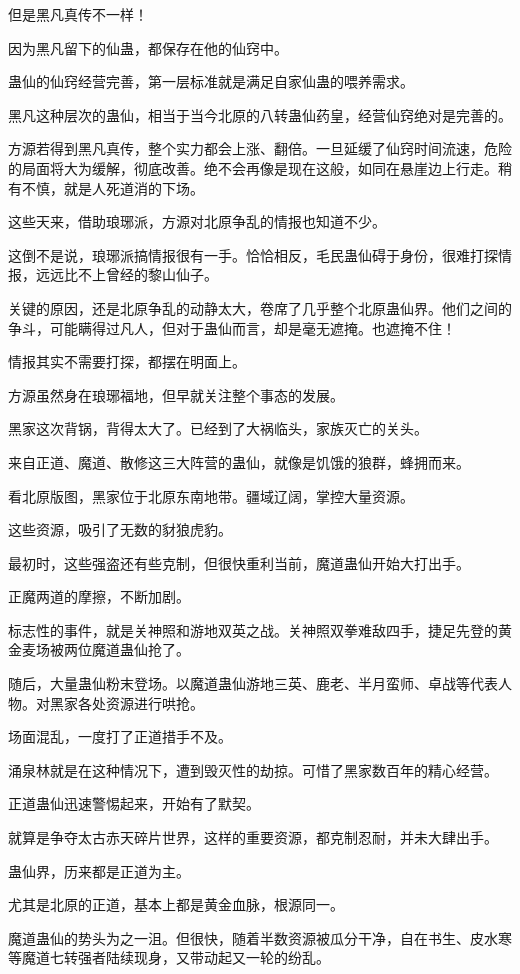 \begin{this_body}
但是黑凡真传不一样！

因为黑凡留下的仙蛊，都保存在他的仙窍中。

蛊仙的仙窍经营完善，第一层标准就是满足自家仙蛊的喂养需求。

黑凡这种层次的蛊仙，相当于当今北原的八转蛊仙药皇，经营仙窍绝对是完善的。

方源若得到黑凡真传，整个实力都会上涨、翻倍。一旦延缓了仙窍时间流速，危险的局面将大为缓解，彻底改善。绝不会再像是现在这般，如同在悬崖边上行走。稍有不慎，就是人死道消的下场。

这些天来，借助琅琊派，方源对北原争乱的情报也知道不少。

这倒不是说，琅琊派搞情报很有一手。恰恰相反，毛民蛊仙碍于身份，很难打探情报，远远比不上曾经的黎山仙子。

关键的原因，还是北原争乱的动静太大，卷席了几乎整个北原蛊仙界。他们之间的争斗，可能瞒得过凡人，但对于蛊仙而言，却是毫无遮掩。也遮掩不住！

情报其实不需要打探，都摆在明面上。

方源虽然身在琅琊福地，但早就关注整个事态的发展。

黑家这次背锅，背得太大了。已经到了大祸临头，家族灭亡的关头。

来自正道、魔道、散修这三大阵营的蛊仙，就像是饥饿的狼群，蜂拥而来。

看北原版图，黑家位于北原东南地带。疆域辽阔，掌控大量资源。

这些资源，吸引了无数的豺狼虎豹。

最初时，这些强盗还有些克制，但很快重利当前，魔道蛊仙开始大打出手。

正魔两道的摩擦，不断加剧。

标志性的事件，就是关神照和游地双英之战。关神照双拳难敌四手，捷足先登的黄金麦场被两位魔道蛊仙抢了。

随后，大量蛊仙粉末登场。以魔道蛊仙游地三英、鹿老、半月蛮师、卓战等代表人物。对黑家各处资源进行哄抢。

场面混乱，一度打了正道措手不及。

涌泉林就是在这种情况下，遭到毁灭性的劫掠。可惜了黑家数百年的精心经营。

正道蛊仙迅速警惕起来，开始有了默契。

就算是争夺太古赤天碎片世界，这样的重要资源，都克制忍耐，并未大肆出手。

蛊仙界，历来都是正道为主。

尤其是北原的正道，基本上都是黄金血脉，根源同一。

魔道蛊仙的势头为之一沮。但很快，随着半数资源被瓜分干净，自在书生、皮水寒等魔道七转强者陆续现身，又带动起又一轮的纷乱。


\end{this_body}
